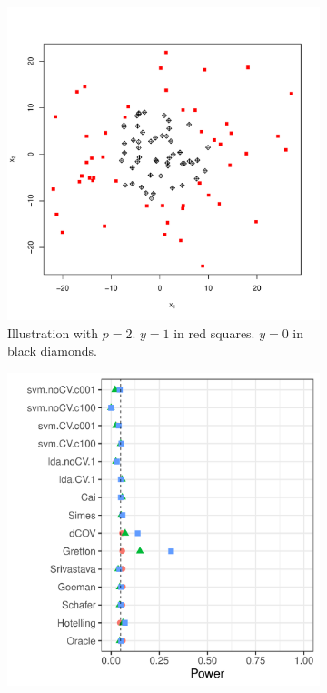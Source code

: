 \documentclass[oupdraft]{bio}
\begin{document}
\begin{figure}[th]
	\centering
	\begin{subfigure}[t]{.3\columnwidth}
		\centering
		\includegraphics[width=1\linewidth]{quadratic-form}
		\caption{
			Illustration with $p=2$. 
			$y=1$ in red squares. 
			$y=0$ in black diamonds.}
		\label{fig:quadratic-form}
	\end{subfigure}
	\begin{subfigure}[t]{.3\columnwidth}
		\centering
	\includegraphics[width=1\columnwidth]{"file42"}

\end{subfigure}
\end{figure}
\end{document}
